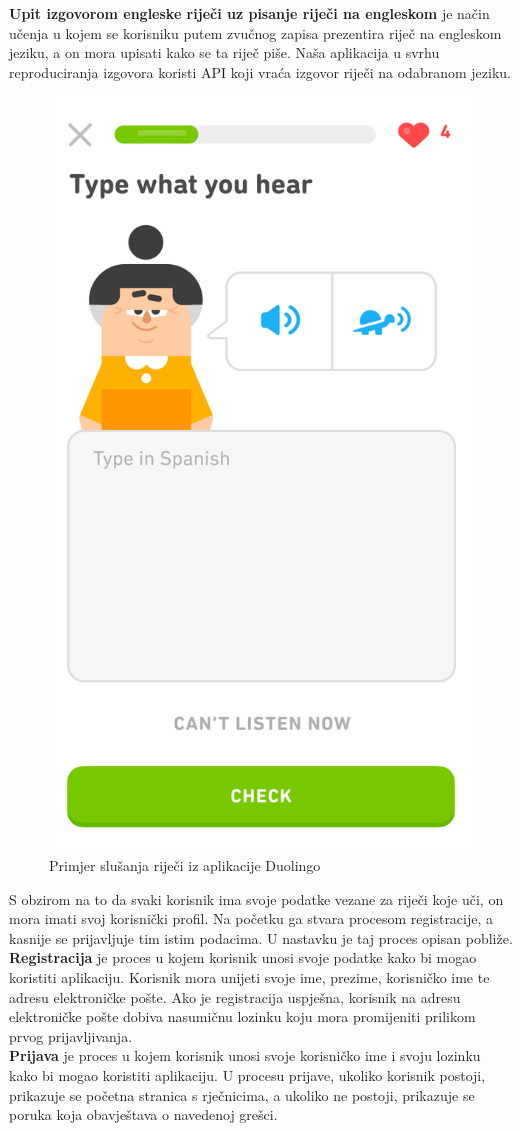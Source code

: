 		\textbf{Upit izgovorom engleske riječi uz pisanje riječi na engleskom} je način učenja u kojem se korisniku putem zvučnog zapisa prezentira riječ na engleskom jeziku, a on mora upisati kako se ta riječ piše. Naša aplikacija u svrhu reproduciranja izgovora koristi API koji vraća izgovor riječi na odabranom jeziku.
		\begin{figure}[H]
			\centering
			\includegraphics[width=0.4\linewidth]{slike/Duolingo.png}
			\caption{Primjer slušanja riječi iz aplikacije Duolingo}
			\label{fig:rijecnik}
		\end{figure}
		\noindent S obzirom na to da svaki korisnik ima svoje podatke vezane za riječi koje uči, on mora imati svoj korisnički profil. Na početku ga stvara procesom registracije, a kasnije se prijavljuje tim istim podacima. U nastavku je taj proces opisan pobliže.
		\\

		\textbf{Registracija} je proces u kojem korisnik unosi svoje podatke kako bi mogao koristiti aplikaciju. Korisnik mora unijeti svoje ime, prezime, korisničko ime te adresu elektroničke pošte.
		Ako je registracija uspješna, korisnik na adresu elektroničke pošte dobiva nasumičnu lozinku koju mora promijeniti prilikom prvog prijavljivanja.
		\\
		
		\textbf{Prijava} je proces u kojem korisnik unosi svoje korisničko ime i svoju lozinku kako bi mogao koristiti aplikaciju. U procesu prijave, ukoliko korisnik postoji, prikazuje se početna stranica s rječnicima, a ukoliko ne postoji, prikazuje se poruka  koja obavještava o navedenoj grešci.
		\\

